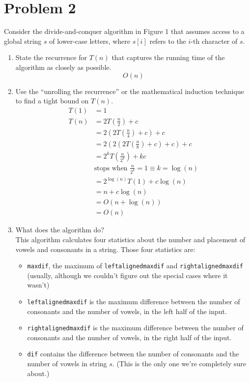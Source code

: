 \documentclass[letterpaper, 12pt]{math}
\begin{document}
\section*{Problem 2}
Consider the divide-and-conquer algorithm in Figure 1 that assumes access to
a global string \( s \) of lower-case letters, where \( s[i] \) refers to
the \( i \)-th character of \( s \).
\begin{enumerate}
  \item State the recurrence for \( T(n) \) that captures the running time of
  the algorithm as closely as possible.
  \[ O(n) \]
  \item Use the ``unrolling the recurrence'' or the mathematical induction
  technique to find a tight bound on \( T(n) \).
  \begin{align*}
    T(1) &= 1 \\
    T(n) &= 2T\left(\frac{n}{2}\right)+c \\
    &= 2\left(2T\left(\frac{n}{4}\right)+c\right)+c \\
    &= 2\left(2\left(2T\left(\frac{n}{8}\right)+c\right)+c\right)+c \\
    &= 2^kT\left(\frac{n}{2^k}\right)+kc \\
    & \text{stops when } \frac{n}{2^k} = 1 \equiv k = \log(n) \\
    &= 2^{\log(n)}T(1)+c\log(n) \\
    &= n+c\log(n) \\
    &= O(n+\log(n)) \\
    &= O(n)
  \end{align*}
  \item What does the algorithm do? \\
  This algorithm calculates four statistics about the number and placement of
  vowels and consonants in a string. Those four statistics are:
  \begin{itemize}
    \item \texttt{maxdif}, the maximum of \texttt{leftalignedmaxdif} and
    \texttt{rightalignedmaxdif} (usually, although we couldn't figure out the
    special cases where it wasn't)
    \item \texttt{leftalignedmaxdif} is the maximum difference between the
    number of consonants and the number of vowels, in the left half of the
    input.
    \item \texttt{rightalignedmaxdif} is the maximum difference between the
    number of consonants and the number of vowels, in the right half of the
    input.
    \item \texttt{dif} contains the difference between the number of consonants
    and the number of vowels in string \( s \). (This is the only one we're
    completely sure about.)
  \end{itemize}
\end{enumerate}
\end{document}
